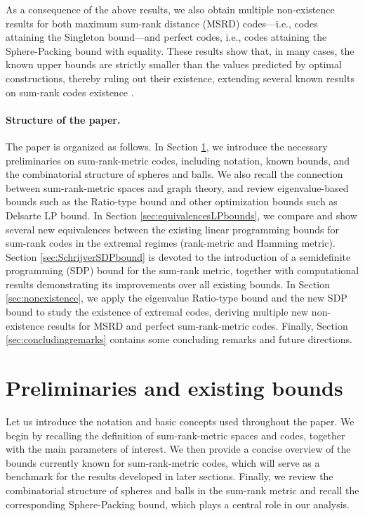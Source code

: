 \documentclass[a4paper]{article}
\begin{document}
As a consequence of the above results, we also obtain multiple non-existence results for both maximum sum-rank distance (MSRD) codes—i.e., codes attaining the Singleton bound—and perfect codes, i.e., codes attaining the Sphere-Packing bound with equality. These results show that, in many cases, the known upper bounds are strictly smaller than the values predicted by optimal constructions, thereby ruling out their existence, extending several known results on sum-rank codes existence \cite{byrne2021fundamental,AKR2024,PRZ2025}.

\paragraph{Structure of the paper.}
The paper is organized as follows. In Section \ref{sec:preliminaries}, we introduce the necessary preliminaries on sum-rank-metric codes, including notation, known bounds, and the combinatorial structure of spheres and balls. We also recall the connection between sum-rank-metric spaces and graph theory, and review eigenvalue-based bounds such as the Ratio-type bound and other optimization bounds such as Delsarte LP bound. In Section \ref{sec:equivalencesLPbounds}, we compare and show several new equivalences between the existing linear programming bounds for sum-rank codes in the extremal regimes (rank-metric and Hamming metric). Section \ref{sec:SchrijverSDPbound} is devoted to the introduction of a semidefinite programming (SDP) bound for the sum-rank metric, together with computational results demonstrating its improvements over all existing bounds. In Section \ref{sec:nonexistence}, we apply the eigenvalue Ratio-type bound and the new SDP bound to study the existence of extremal codes, deriving multiple new non-existence results for MSRD and perfect sum-rank-metric codes. Finally, Section \ref{sec:concludingremarks} contains some concluding remarks and future directions.


\section{Preliminaries and existing bounds}\label{sec:preliminaries}

Let us introduce the notation and basic concepts used throughout the paper. We begin by recalling the definition of sum-rank-metric spaces and codes, together with the main parameters of interest. We then provide a concise overview of the bounds currently known for sum-rank-metric codes, which will serve as a benchmark for the results developed in later sections. Finally, we review the combinatorial structure of spheres and balls in the sum-rank metric and recall the corresponding Sphere-Packing bound, which plays a central role in our analysis.
\end{document}
